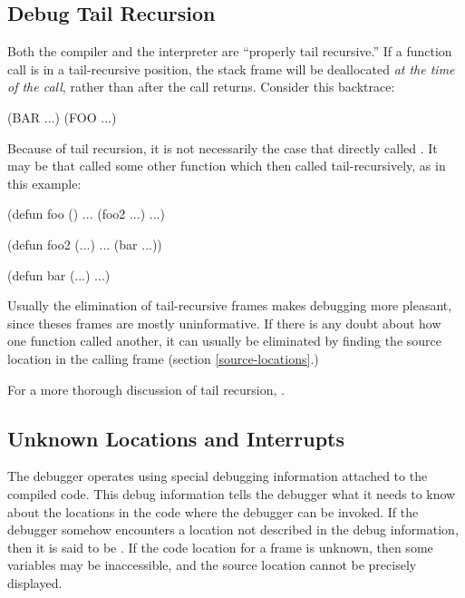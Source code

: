 \subsection{Debug Tail Recursion}
\label{debug-tail-recursion}

Both the compiler and the interpreter are ``properly tail recursive.''  If a
function call is in a tail-recursive position, the stack frame will be
deallocated {\em at the time of the call}, rather than after the call returns.
Consider this backtrace:
\begin{example}
(BAR ...) 
(FOO ...)
\end{example}
Because of tail recursion, it is not necessarily the case that
 directly called .  It may be that  called
some other function  which then called 
tail-recursively, as in this example:
\begin{example}
(defun foo ()
  ...
  (foo2 ...)
  ...)

(defun foo2 (...)
  ...
  (bar ...))

(defun bar (...)
  ...)
\end{example}

Usually the elimination of tail-recursive frames makes debugging more
pleasant, since theses frames are mostly uninformative.  If there is any
doubt about how one function called another, it can usually be
eliminated by finding the source location in the calling frame (section
\ref{source-locations}.)

For a more thorough discussion of tail recursion, .


\subsection{Unknown Locations and Interrupts}
\label{unknown-locations}

The debugger operates using special debugging information attached to
the compiled code.  This debug information tells the debugger what it
needs to know about the locations in the code where the debugger can be
invoked.  If the debugger somehow encounters a location not described in
the debug information, then it is said to be .  If the code
location for a frame is unknown, then some variables may be
inaccessible, and the source location cannot be precisely displayed.

